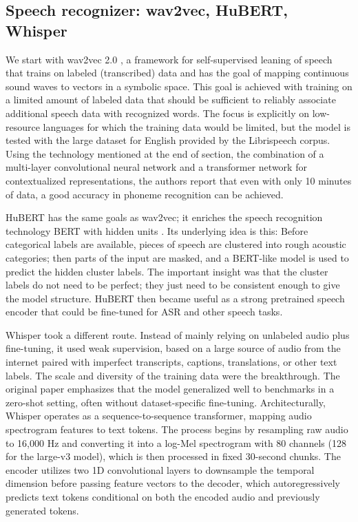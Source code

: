\subsection{Speech recognizer: wav2vec, HuBERT, Whisper}

We start with wav2vec 2.0 \cite{baevski2020}, a framework for self-supervised leaning of speech that trains on labeled (transcribed) data and has the goal of mapping continuous sound waves to vectors in a symbolic space.  This goal is achieved with training on a limited amount of labeled data that should be sufficient to reliably associate additional speech data with recognized words. The focus is explicitly on low-resource languages for which the training data would be limited, but the model is tested with the large dataset for English provided by the Librispeech corpus. Using the technology mentioned at the end of section, the combination of a multi-layer convolutional neural network and a transformer network for contextualized representations, the authors report that even with only 10 minutes of data, a good accuracy in phoneme recognition can be achieved.

HuBERT has the same goals as wav2vec; it enriches the speech recognition technology BERT with hidden units \cite{hsu2021hubert}.  Its underlying idea is this: Before categorical labels are available, pieces of speech are clustered into rough acoustic categories; then parts of the input are masked, and a BERT-like model is used to predict the hidden cluster labels. The important insight was that the cluster labels do not need to be perfect; they just need to be consistent enough to give the model structure. HuBERT then became useful as a strong pretrained speech encoder that could be fine-tuned for ASR and other speech tasks. 

Whisper \cite{radford2023whisper} took a different route. Instead of mainly relying on unlabeled audio plus fine-tuning, it used weak supervision, based on a large source of audio from the internet paired with imperfect transcripts, captions, translations, or other text labels. The scale and diversity of the training data were the breakthrough. The original paper emphasizes that the model generalized well to benchmarks in a zero-shot setting, often without dataset-specific fine-tuning. Architecturally, Whisper operates as a sequence-to-sequence transformer, mapping audio spectrogram features to text tokens. The process begins by resampling raw audio to 16,000 Hz and converting it into a log-Mel spectrogram with 80 channels (128 for the large-v3 model), which is then processed in fixed 30-second chunks. The encoder utilizes two 1D convolutional layers to downsample the temporal dimension before passing feature vectors to the decoder, which autoregressively predicts text tokens conditional on both the encoded audio and previously generated tokens. 

